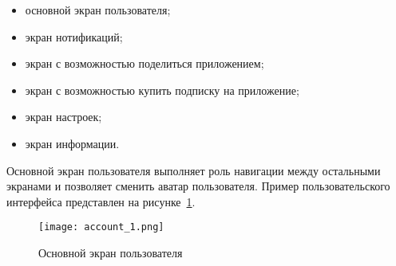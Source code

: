 \begin{itemize}
    \item основной экран пользователя;
    \item экран нотификаций;
    \item экран с возможностью поделиться приложением;
    \item экран с возможностью купить подписку на приложение;
    \item экран настроек;
    \item экран информации.
\end{itemize}

Основной экран пользователя выполняет роль навигации между остальными экранами и позволяет сменить аватар пользователя. Пример пользовательского интерфейса представлен на рисунке~\ref{fig:arch:account_1}.

\begin{figure}[H]
 \centering
   \texttt{[image: account\_1.png]} 
   \caption{Основной экран пользователя}
   \label{fig:arch:account_1}
\end{figure}


